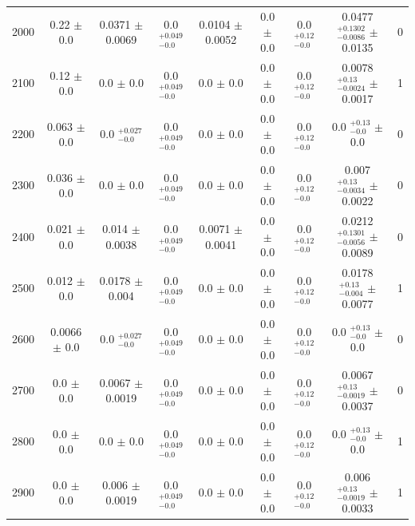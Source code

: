 \begin{table}[H]
\begin{center}
\begin{tabular}{ccccccccc}
            2000  &     0.22 $\pm$ 0.0  &     	 0.0371 $\pm$ 0.0069  &         0.0 $ _{-0.0}^{+0.049}$  &  0.0104 $\pm$ 0.0052  &	 0.0 $\pm$ 0.0  &           0.0 $ _{-0.0}^{+0.12}$   &  0.0477 $ _{-0.0086}^{+0.1302}$   $\pm$ 0.0135  &    0 \\
            2100  &     0.12 $\pm$ 0.0  &     	 0.0 $\pm$ 0.0  &               0.0 $ _{-0.0}^{+0.049}$  &  0.0 $\pm$ 0.0  &      	 0.0 $\pm$ 0.0  &           0.0 $ _{-0.0}^{+0.12}$   &  0.0078 $ _{-0.0024}^{+0.13}$   $\pm$ 0.0017  &      1 \\
            2200  &     0.063 $\pm$ 0.0  &    	 0.0 $ _{-0.0}^{+0.027}$   &    0.0 $ _{-0.0}^{+0.049}$  &  0.0 $\pm$ 0.0  &      	 0.0 $\pm$ 0.0  &           0.0 $ _{-0.0}^{+0.12}$   &  0.0 $ _{-0.0}^{+0.13}$   $\pm$ 0.0  &               0 \\
            2300  &     0.036 $\pm$ 0.0  &    	 0.0 $\pm$ 0.0  &               0.0 $ _{-0.0}^{+0.049}$  &  0.0 $\pm$ 0.0  &      	 0.0 $\pm$ 0.0  &           0.0 $ _{-0.0}^{+0.12}$   &  0.007 $ _{-0.0034}^{+0.13}$   $\pm$ 0.0022  &       0 \\
            2400  &     0.021 $\pm$ 0.0  &    	 0.014 $\pm$ 0.0038  &          0.0 $ _{-0.0}^{+0.049}$  &  0.0071 $\pm$ 0.0041  &	 0.0 $\pm$ 0.0  &           0.0 $ _{-0.0}^{+0.12}$   &  0.0212 $ _{-0.0056}^{+0.1301}$   $\pm$ 0.0089  &    0 \\
            2500  &     0.012 $\pm$ 0.0  &    	 0.0178 $\pm$ 0.004  &          0.0 $ _{-0.0}^{+0.049}$  &  0.0 $\pm$ 0.0  &      	 0.0 $\pm$ 0.0  &           0.0 $ _{-0.0}^{+0.12}$   &  0.0178 $ _{-0.004}^{+0.13}$   $\pm$ 0.0077  &       1 \\
            2600  &     0.0066 $\pm$ 0.0  &   	 0.0 $ _{-0.0}^{+0.027}$   &    0.0 $ _{-0.0}^{+0.049}$  &  0.0 $\pm$ 0.0  &      	 0.0 $\pm$ 0.0  &           0.0 $ _{-0.0}^{+0.12}$   &  0.0 $ _{-0.0}^{+0.13}$   $\pm$ 0.0  &               0 \\
            2700  &     0.0 $\pm$ 0.0  &      	 0.0067 $\pm$ 0.0019  &         0.0 $ _{-0.0}^{+0.049}$  &  0.0 $\pm$ 0.0  &      	 0.0 $\pm$ 0.0  &           0.0 $ _{-0.0}^{+0.12}$   &  0.0067 $ _{-0.0019}^{+0.13}$   $\pm$ 0.0037  &      0 \\
            2800  &     0.0 $\pm$ 0.0  &      	 0.0 $\pm$ 0.0  &               0.0 $ _{-0.0}^{+0.049}$  &  0.0 $\pm$ 0.0  &      	 0.0 $\pm$ 0.0  &           0.0 $ _{-0.0}^{+0.12}$   &  0.0 $ _{-0.0}^{+0.13}$   $\pm$ 0.0  &               1 \\
            2900  &     0.0 $\pm$ 0.0  &      	 0.006 $\pm$ 0.0019  &          0.0 $ _{-0.0}^{+0.049}$  &  0.0 $\pm$ 0.0  &      	 0.0 $\pm$ 0.0  &           0.0 $ _{-0.0}^{+0.12}$   &  0.006 $ _{-0.0019}^{+0.13}$   $\pm$ 0.0033  &       1 \\

\end{tabular}
\end{center}
\end{table}
